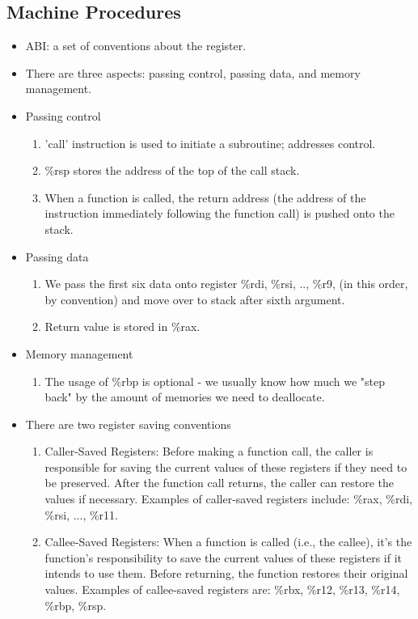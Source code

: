 \documentclass[11pt,reqno]{amsart}
\theoremstyle{remark}
\begin{document}
\subsection*{Machine Procedures}
\begin{itemize}
\item ABI: a set of conventions about the register.
\item There are three aspects: passing control, passing data, and memory management.
\item Passing control
\begin{enumerate}
\item 'call' instruction is used to initiate a subroutine; addresses control.
\item \%rsp stores the address of the top of the call stack.
\item When a function is called, the return address (the address of the instruction immediately 
following the function call) is pushed onto the stack. 
\end{enumerate}
\item Passing data
\begin{enumerate}
\item We pass the first six data onto register \%rdi, \%rsi, .., \%r9, (in this order, by convention)
 and move over to stack after sixth argument.
 \item Return value is stored in \%rax.
\end{enumerate}
\item Memory management
\begin{enumerate}
\item The usage of \%rbp is optional - we usually know how much we "step back" by the amount of memories we need to deallocate.
\end{enumerate}
\item There are two register saving conventions
\begin{enumerate}
\item Caller-Saved Registers: Before making a function call, the caller 
is responsible for saving the current values of these registers 
if they need to be preserved. After the function call returns, 
the caller can restore the values if necessary. Examples 
of caller-saved registers include: \%rax, \%rdi, \%rsi, ..., \%r11.

\item Callee-Saved Registers: When a function is called (i.e., 
the callee), it's the function's responsibility to save the current 
values of these registers if it intends to
 use them. Before returning, 
the function restores their original values. Examples of callee-saved 
registers are: \%rbx, \%r12, \%r13, \%r14, \%rbp, \%rsp.
\end{enumerate}
\end{itemize}
\end{document}
